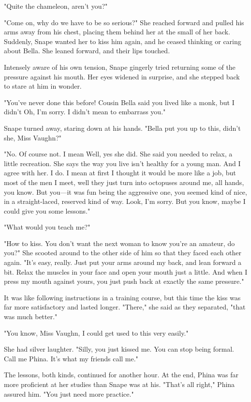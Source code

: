 "Quite the chameleon, aren't you?"

"Come on, why do we have to be so serious?" She reached forward and pulled his arms away from his chest, placing them behind her at the small of her back. Suddenly, Snape wanted her to kiss him again, and he ceased thinking or caring about Bella. She leaned forward, and their lips touched.

Intensely aware of his own tension, Snape gingerly tried returning some of the pressure against his mouth. Her eyes widened in surprise, and she stepped back to stare at him in wonder.

"You've never done this before! Cousin Bella said you lived like a monk, but I didn't{\el} Oh, I'm sorry. I didn't mean to embarrass you."

Snape turned away, staring down at his hands. "Bella put you up to this, didn't she, Miss Vaughn?"

"No. Of course not. I mean{\el} Well, yes she did. She said you needed to relax, a little recreation. She says the way you live isn't healthy for a young man. And I agree with her. I do. I mean at first I thought it would be more like a job, but most of the men I meet, well they just turn into octopuses around me, all hands, you know. But you—it was fun being the aggressive one, you seemed kind of nice, in a straight-laced, reserved kind of way. Look, I'm sorry. But you know, maybe I could give you some lessons."

"What would you teach me?"

"How to kiss. You don't want the next woman to know you're an amateur, do you?" She scooted around to the other side of him so that they faced each other again. "It's easy, really. Just put your arms around my back, and lean forward a bit. Relax the muscles in your face and open your mouth just a little. And when I press my mouth against yours, you just push back at exactly the same pressure."

It was like following instructions in a training course, but this time the kiss was far more satisfactory and lasted longer. "There," she said as they separated, "that was much better."

"You know, Miss Vaughn, I could get used to this very easily."

She had silver laughter. "Silly, you just kissed me. You can stop being formal. Call me Phina. It's what my friends call me."

The lessons, both kinds, continued for another hour. At the end, Phina was far more proficient at her studies than Snape was at his. "That's all right," Phina assured him. "You just need more practice."

